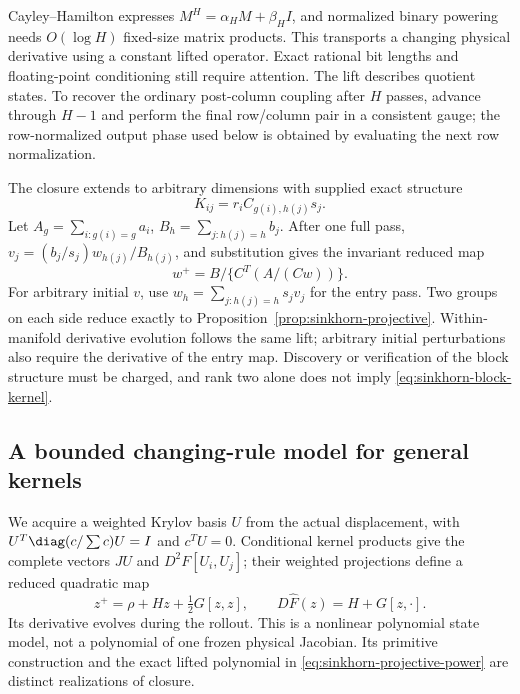 Cayley--Hamilton expresses $M^H=\alpha_HM+\beta_HI$, and normalized binary
powering needs $O(\log H)$ fixed-size matrix products. This transports a
changing physical derivative using a constant lifted operator. Exact
rational bit lengths and floating-point conditioning still require attention.
The lift describes quotient states. To recover the ordinary post-column
coupling after $H$ passes, advance through $H-1$ and perform the final
row/column pair in a consistent gauge; the row-normalized output phase used
below is obtained by evaluating the next row normalization.

The closure extends to arbitrary dimensions with supplied exact structure
\begin{equation}
 K_{ij}=r_i C_{g(i),h(j)}s_j.
 \label{eq:sinkhorn-block-kernel}
\end{equation}
Let $A_g=\sum_{i:g(i)=g}a_i$, $B_h=\sum_{j:h(j)=h}b_j$.
After one full pass, $v_j=(b_j/s_j)w_{h(j)}/B_{h(j)}$, and substitution
gives the invariant reduced map
\begin{equation}
 w^+=B\big/\{C^T(A/(Cw))\}.
 \label{eq:sinkhorn-block-map}
\end{equation}
For arbitrary initial $v$, use $w_h=\sum_{j:h(j)=h}s_jv_j$ for the entry
pass. Two groups on each side reduce exactly to
Proposition~\ref{prop:sinkhorn-projective}. Within-manifold derivative
evolution follows the same lift; arbitrary initial perturbations also
require the derivative of the entry map. Discovery or verification of the
block structure must be charged, and rank two alone does not imply
\eqref{eq:sinkhorn-block-kernel}.

\subsection{A bounded changing-rule model for general kernels}
We acquire a weighted Krylov basis $U$ from the actual displacement, with
$U^T\diag(c/\sum c)U=I$ and $c^TU=0$. Conditional kernel products give
the complete vectors $JU$ and $D^2F[U_i,U_j]$; their weighted projections
define a reduced quadratic map
\begin{equation}
 z^+=\rho+Hz+\tfrac12G[z,z],\qquad
 D\widehat F(z)=H+G[z,\cdot].
 \label{eq:sinkhorn-reduced-rule}
\end{equation}
Its derivative evolves during the rollout. This is a nonlinear polynomial
state model, not a polynomial of one frozen physical Jacobian. Its primitive
construction and the exact lifted polynomial in
\eqref{eq:sinkhorn-projective-power} are distinct realizations of closure.

